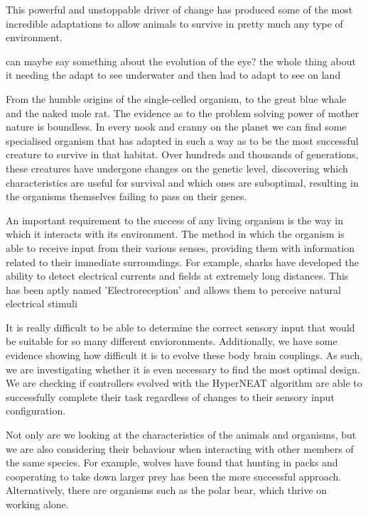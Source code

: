 This powerful and unstoppable driver of change has produced some of the most incredible adaptations to allow animals to survive in pretty much any type of environment.

can maybe say something about the evolution of the eye? the whole thing about it needing the adapt to see underwater and then had to adapt to see on land

From the humble origins of the single-celled organism, to the great blue whale and the naked mole rat. The evidence as to the problem solving power of mother nature is boundless. In every nook and cranny on the planet we can find some specialised organism that has adapted in such a way as to be the most successful creature to survive in that habitat. Over hundreds and thousands of generations, these creatures have undergone changes on the genetic level, discovering which characteristics are useful for survival and which ones are suboptimal, resulting in the organisms themselves failing to pass on their genes.

An important requirement to the success of any living organism is the way in which it interacts with its environment. The method in which the organism is able to receive input from their various senses, providing them with information related to their immediate surroundings. For example, sharks have developed the ability to detect electrical currents and fields at extremely long distances. This has been aptly named 'Electroreception' and allows them to perceive natural electrical stimuli



It is really difficult to be able to determine the correct sensory input that would be suitable for so many different envioronments. Additionally, we have some evidence showing how difficult it is to evolve these body brain couplings. As such, we are investigating whether it is even necessary to find the most optimal design. We are checking if controllers evolved with the HyperNEAT algorithm are able to successfully complete their task regardless of changes to their sensory input configuration.

Not only are we looking at the characteristics of the animals and organisms, but we are also considering their behaviour when interacting with other members of the same species. For example, wolves have found that hunting in packs and cooperating to take down larger prey has been the more successful approach. Alternatively, there are organisms such as the polar bear, which thrive on working alone.

